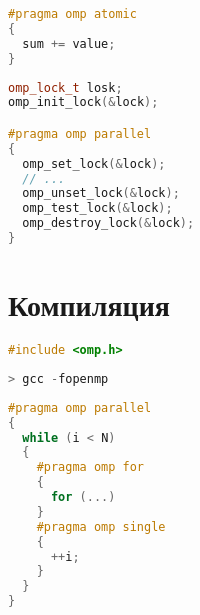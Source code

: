 \begin{frame}[fragile]

\begin{lstlisting}[language=C++,basicstyle=\ttfamily,keywordstyle=\color{blue},basicstyle=\scriptsize]
#pragma omp atomic
{
  sum += value;
}
\end{lstlisting}

\end{frame}

\begin{frame}[fragile]

\begin{lstlisting}[language=C++,basicstyle=\ttfamily,keywordstyle=\color{blue},basicstyle=\scriptsize]
omp_lock_t losk;
omp_init_lock(&lock);

#pragma omp parallel
{
  omp_set_lock(&lock);
  // ...
  omp_unset_lock(&lock);
  omp_test_lock(&lock);
  omp_destroy_lock(&lock);
}
\end{lstlisting}

\end{frame}

\section{Компиляция}

\begin{frame}[fragile]

\begin{lstlisting}[language=C++,basicstyle=\ttfamily,keywordstyle=\color{blue},basicstyle=\scriptsize]
#include <omp.h>
\end{lstlisting}

\begin{lstlisting}[language=C++,basicstyle=\ttfamily,keywordstyle=\color{blue},basicstyle=\scriptsize]
> gcc -fopenmp
\end{lstlisting}

\end{frame}

\begin{frame}[fragile]

\begin{lstlisting}[language=C++,basicstyle=\ttfamily,keywordstyle=\color{blue},basicstyle=\scriptsize]
#pragma omp parallel
{
  while (i < N)
  {
    #pragma omp for
    {
      for (...)
    }
    #pragma omp single
    {
      ++i;
    }
  }
}
\end{lstlisting}

\end{frame}

